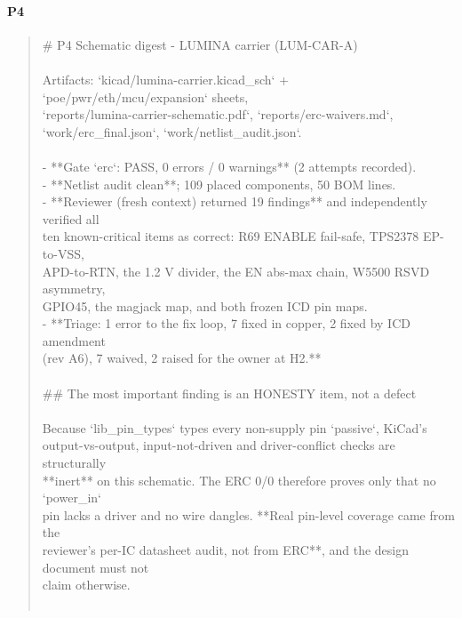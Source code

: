 \documentclass[11pt,a4paper]{article}
\begin{document}
\paragraph*{P4}
\begin{quote}\small\ttfamily\raggedright
\# P4 Schematic digest - LUMINA carrier (LUM-CAR-A)\\
~\\
Artifacts: `kicad/lumina-carrier.kicad\_sch` + `poe/pwr/eth/mcu/expansion` sheets,\\
`reports/lumina-carrier-schematic.pdf`, `reports/erc-waivers.md`,\\
`work/erc\_final.json`, `work/netlist\_audit.json`.\\
~\\
- {*}{*}Gate `erc`: PASS, 0 errors / 0 warnings{*}{*} (2 attempts recorded).\\
- {*}{*}Netlist audit clean{*}{*}; 109 placed components, 50 BOM lines.\\
- {*}{*}Reviewer (fresh context) returned 19 findings{*}{*} and independently verified all\\
  ten known-critical items as correct: R69 ENABLE fail-safe, TPS2378 EP-to-VSS,\\
  APD-to-RTN, the 1.2 V divider, the EN abs-max chain, W5500 RSVD asymmetry,\\
  GPIO45, the magjack map, and both frozen ICD pin maps.\\
- {*}{*}Triage: 1 error to the fix loop, 7 fixed in copper, 2 fixed by ICD amendment\\
  (rev A6), 7 waived, 2 raised for the owner at H2.{*}{*}\\
~\\
\#\# The most important finding is an HONESTY item, not a defect\\
~\\
Because `lib\_pin\_types` types every non-supply pin `passive`, KiCad's\\
output-vs-output, input-not-driven and driver-conflict checks are structurally\\
{*}{*}inert{*}{*} on this schematic. The ERC 0/0 therefore proves only that no `power\_in`\\
pin lacks a driver and no wire dangles. {*}{*}Real pin-level coverage came from the\\
reviewer's per-IC datasheet audit, not from ERC{*}{*}, and the design document must not\\
claim otherwise.\\
~\\

\end{quote}
\end{document}
